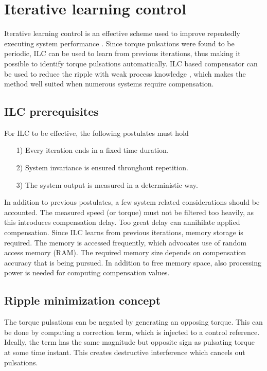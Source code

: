\section{Iterative learning control}
Iterative learning control is an effective scheme used to improve repeatedly executing system performance \cite{ILC:2018}. Since torque pulsations were found to be periodic, ILC can be used to learn from previous iterations, thus making it possible to identify torque pulsations automatically. ILC based compensator can be used to reduce the ripple with weak process knowledge \cite{ILC:2007}, which makes the method well suited when numerous systems require compensation.


\subsection{ILC prerequisites}
For ILC to be effective, the following postulates must hold \cite{ILC:Book2007, ILC:2012, ILC:1998}
\begin{itemize}
  \item[1)] Every iteration ends in a fixed time duration.
  \item[2)] System invariance is ensured throughout repetition.
  \item[3)] The system output is measured in a deterministic way.
\end{itemize}
In addition to previous postulates, a few system related considerations should be accounted. The measured speed (or torque) must not be filtered too heavily, as this introduces compensation delay. Too great delay can annihilate applied compensation. Since ILC learns from previous iterations, memory storage is required. The memory is accessed frequently, which advocates use of random access memory (RAM). The required memory size depends on compensation accuracy that is being pursued. In addition to free memory space, also processing power is needed for computing compensation values.


\subsection{Ripple minimization concept}
The torque pulsations can be negated by generating an opposing torque. This can be done by computing a correction term, which is injected to a control reference. Ideally, the term has the same magnitude but opposite sign as pulsating torque at some time instant. This creates destructive interference which cancels out pulsations.

